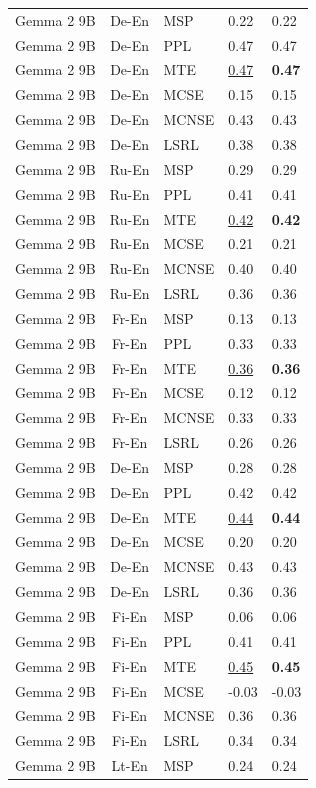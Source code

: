 \begin{table}
\begin{tabular}{lc}
Gemma 2 9B & De-En & MSP & 0.22 & 0.22 \\
Gemma 2 9B & De-En & PPL & 0.47 & 0.47 \\
Gemma 2 9B & De-En & MTE & \underline{0.47} & \textbf{0.47} \\
Gemma 2 9B & De-En & MCSE & 0.15 & 0.15 \\
Gemma 2 9B & De-En & MCNSE & 0.43 & 0.43 \\
Gemma 2 9B & De-En & LSRL & 0.38 & 0.38 \\
Gemma 2 9B & Ru-En & MSP & 0.29 & 0.29 \\
Gemma 2 9B & Ru-En & PPL & 0.41 & 0.41 \\
Gemma 2 9B & Ru-En & MTE & \underline{0.42} & \textbf{0.42} \\
Gemma 2 9B & Ru-En & MCSE & 0.21 & 0.21 \\
Gemma 2 9B & Ru-En & MCNSE & 0.40 & 0.40 \\
Gemma 2 9B & Ru-En & LSRL & 0.36 & 0.36 \\
Gemma 2 9B & Fr-En & MSP & 0.13 & 0.13 \\
Gemma 2 9B & Fr-En & PPL & 0.33 & 0.33 \\
Gemma 2 9B & Fr-En & MTE & \underline{0.36} & \textbf{0.36} \\
Gemma 2 9B & Fr-En & MCSE & 0.12 & 0.12 \\
Gemma 2 9B & Fr-En & MCNSE & 0.33 & 0.33 \\
Gemma 2 9B & Fr-En & LSRL & 0.26 & 0.26 \\
Gemma 2 9B & De-En & MSP & 0.28 & 0.28 \\
Gemma 2 9B & De-En & PPL & 0.42 & 0.42 \\
Gemma 2 9B & De-En & MTE & \underline{0.44} & \textbf{0.44} \\
Gemma 2 9B & De-En & MCSE & 0.20 & 0.20 \\
Gemma 2 9B & De-En & MCNSE & 0.43 & 0.43 \\
Gemma 2 9B & De-En & LSRL & 0.36 & 0.36 \\
Gemma 2 9B & Fi-En & MSP & 0.06 & 0.06 \\
Gemma 2 9B & Fi-En & PPL & 0.41 & 0.41 \\
Gemma 2 9B & Fi-En & MTE & \underline{0.45} & \textbf{0.45} \\
Gemma 2 9B & Fi-En & MCSE & -0.03 & -0.03 \\
Gemma 2 9B & Fi-En & MCNSE & 0.36 & 0.36 \\
Gemma 2 9B & Fi-En & LSRL & 0.34 & 0.34 \\
Gemma 2 9B & Lt-En & MSP & 0.24 & 0.24 \\

\end{tabular}
\end{table}
